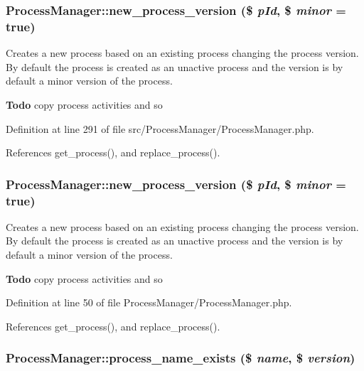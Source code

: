 \subsubsection{\setlength{\rightskip}{0pt plus 5cm}Process\-Manager::new\_\-process\_\-version (\$ {\em p\-Id}, \$ {\em minor} = true)}\label{classProcessManager_a16}


Creates a new process based on an existing process changing the process version. By default the process is created as an unactive process and the version is by default a minor version of the process.

\begin{Desc}
\item[{\bf Todo}]copy process activities and so \end{Desc}


Definition at line 291 of file src/Process\-Manager/Process\-Manager.php.

References get\_\-process(), and replace\_\-process().
\subsubsection{\setlength{\rightskip}{0pt plus 5cm}Process\-Manager::new\_\-process\_\-version (\$ {\em p\-Id}, \$ {\em minor} = true)}\label{classProcessManager_a3}


Creates a new process based on an existing process changing the process version. By default the process is created as an unactive process and the version is by default a minor version of the process.

\begin{Desc}
\item[{\bf Todo}]copy process activities and so \end{Desc}


Definition at line 50 of file Process\-Manager/Process\-Manager.php.

References get\_\-process(), and replace\_\-process().
\subsubsection{\setlength{\rightskip}{0pt plus 5cm}Process\-Manager::process\_\-name\_\-exists (\$ {\em name}, \$ {\em version})}\label{classProcessManager_a17}


